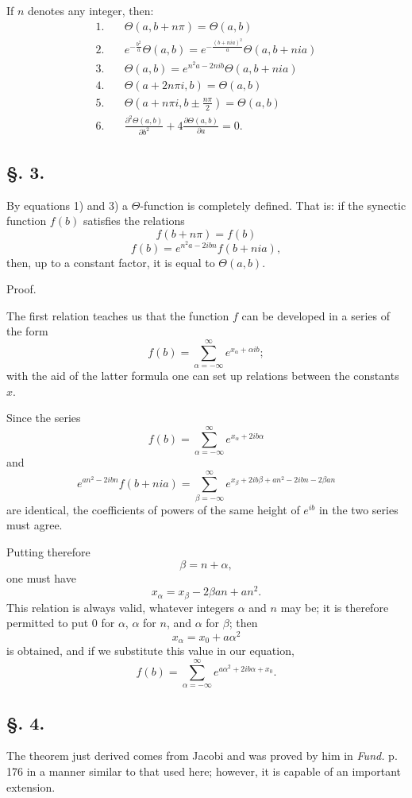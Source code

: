 \documentclass[10pt]{article}
\newcommand{\dd}{\partial}
\newcommand{\sourceanchor}[1]{\hypertarget{source-#1}{}}
\begin{document}
If \(n\) denotes any integer, then:
\begin{align*}
1.\quad& \Theta(a,b+n\pi)=\Theta(a,b)\\
2.\quad& e^{-\frac{b^{2}}{a}}\Theta(a,b)=e^{-\frac{(b+nia)^{2}}{a}}\Theta(a,b+nia)\\
3.\quad& \Theta(a,b)=e^{n^{2}a-2nib}\Theta(a,b+nia)\\
4.\quad& \Theta(a+2n\pi i,b)=\Theta(a,b)\\
5.\quad& \Theta\!\left(a+n\pi i,b\pm \frac{n\pi}{2}\right)=\Theta(a,b)\\
6.\quad& \frac{\dd^{2}\Theta(a,b)}{\dd b^{2}}+4\frac{\dd\Theta(a,b)}{\dd a}=0.
\end{align*}

\subsection*{\S. 3.}
By equations 1) and 3) a \(\Theta\)-function is completely defined. That is: if the synectic function \(f(b)\) satisfies the relations
\[
f(b+n\pi)=f(b)
\]
\[
f(b)=e^{n^{2}a-2ibn}f(b+nia),
\]
then, up to a constant factor, it is equal to \(\Theta(a,b)\).

\sourceanchor{PA04}
\begin{center}Proof.\end{center}
The first relation teaches us that the function \(f\) can be developed in a series of the form
\[
f(b)=\sum_{\alpha=-\infty}^{\infty} e^{x_{\alpha}+\alpha ib};
\]
with the aid of the latter formula one can set up relations between the constants \(x\).

Since the series
\[
f(b)=\sum_{\alpha=-\infty}^{\infty}e^{x_{\alpha}+2ib\alpha}
\]
and
\[
e^{an^{2}-2ibn}f(b+nia)=\sum_{\beta=-\infty}^{\infty}e^{x_{\beta}+2ib\beta+an^{2}-2ibn-2\beta an}
\]
are identical, the coefficients of powers of the same height of \(e^{ib}\) in the two series must agree.

Putting therefore
\[
\beta=n+\alpha,
\]
one must have
\[
x_{\alpha}=x_{\beta}-2\beta an+an^{2}.
\]
This relation is always valid, whatever integers \(\alpha\) and \(n\) may be; it is therefore permitted to put \(0\) for \(\alpha\), \(\alpha\) for \(n\), and \(\alpha\) for \(\beta\); then
\[
x_{\alpha}=x_{0}+a\alpha^{2}
\]
is obtained, and if we substitute this value in our equation,
\[
f(b)=\sum_{\alpha=-\infty}^{\infty}e^{a\alpha^{2}+2ib\alpha+x_{0}}.
\]

\subsection*{\S. 4.}
The theorem just derived comes from Jacobi and was proved by him in \textit{Fund.} p. 176 in a manner similar to that used here; however, it is capable of an important extension.
\end{document}
